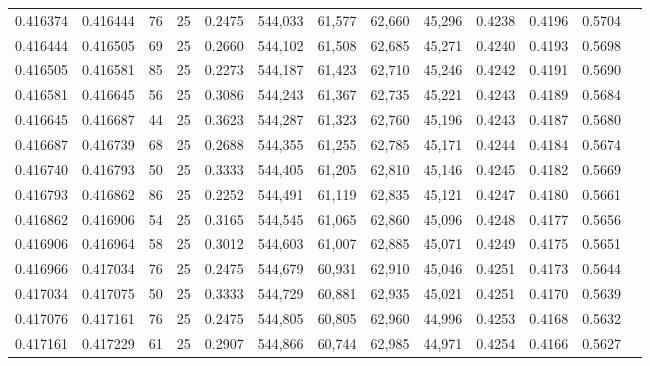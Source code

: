 \begin{tabular}{rrrrrrrrrrrrr}
0.416374 & 0.416444 &    76 &  25 &                                     0.2475 & 544,033 &  61,577 &  62,660 &  45,296 & 0.4238 & 0.4196 & 0.5704 \\
0.416444 & 0.416505 &    69 &  25 &                                     0.2660 & 544,102 &  61,508 &  62,685 &  45,271 & 0.4240 & 0.4193 & 0.5698 \\
0.416505 & 0.416581 &    85 &  25 &                                     0.2273 & 544,187 &  61,423 &  62,710 &  45,246 & 0.4242 & 0.4191 & 0.5690 \\
0.416581 & 0.416645 &    56 &  25 &                                     0.3086 & 544,243 &  61,367 &  62,735 &  45,221 & 0.4243 & 0.4189 & 0.5684 \\
0.416645 & 0.416687 &    44 &  25 &                                     0.3623 & 544,287 &  61,323 &  62,760 &  45,196 & 0.4243 & 0.4187 & 0.5680 \\
0.416687 & 0.416739 &    68 &  25 &                                     0.2688 & 544,355 &  61,255 &  62,785 &  45,171 & 0.4244 & 0.4184 & 0.5674 \\
0.416740 & 0.416793 &    50 &  25 &                                     0.3333 & 544,405 &  61,205 &  62,810 &  45,146 & 0.4245 & 0.4182 & 0.5669 \\
0.416793 & 0.416862 &    86 &  25 &                                     0.2252 & 544,491 &  61,119 &  62,835 &  45,121 & 0.4247 & 0.4180 & 0.5661 \\
0.416862 & 0.416906 &    54 &  25 &                                     0.3165 & 544,545 &  61,065 &  62,860 &  45,096 & 0.4248 & 0.4177 & 0.5656 \\
0.416906 & 0.416964 &    58 &  25 &                                     0.3012 & 544,603 &  61,007 &  62,885 &  45,071 & 0.4249 & 0.4175 & 0.5651 \\
0.416966 & 0.417034 &    76 &  25 &                                     0.2475 & 544,679 &  60,931 &  62,910 &  45,046 & 0.4251 & 0.4173 & 0.5644 \\
0.417034 & 0.417075 &    50 &  25 &                                     0.3333 & 544,729 &  60,881 &  62,935 &  45,021 & 0.4251 & 0.4170 & 0.5639 \\
0.417076 & 0.417161 &    76 &  25 &                                     0.2475 & 544,805 &  60,805 &  62,960 &  44,996 & 0.4253 & 0.4168 & 0.5632 \\
0.417161 & 0.417229 &    61 &  25 &                                     0.2907 & 544,866 &  60,744 &  62,985 &  44,971 & 0.4254 & 0.4166 & 0.5627 \\

\end{tabular}
